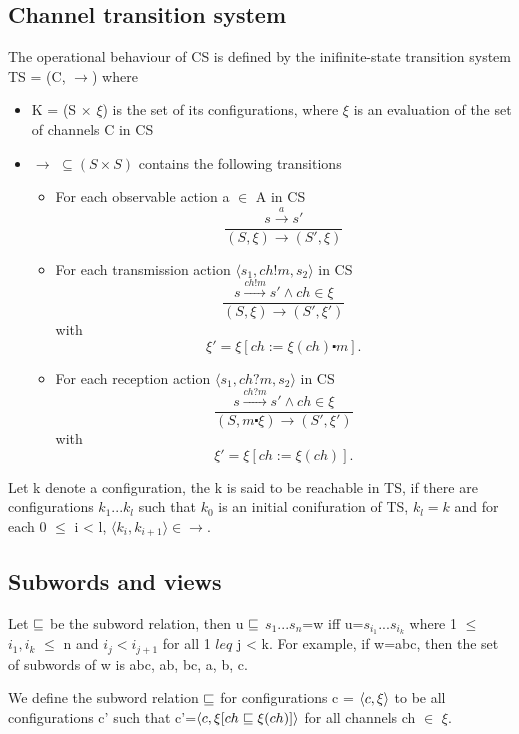 \subsection{Channel transition system}
The operational behaviour of CS is defined by the inifinite-state transition system TS = (C, $\rightarrow$) where
\begin{itemize}
\item[]
   K = (S $\times$ $\xi$) is the set of its configurations, where $\xi$ is an evaluation of the set of channels C in CS
\item[]
  $\rightarrow$ $\subseteq (S \times S)$ contains the following transitions
  \begin{itemize}
    \item
      For each observable action a $\in$ A in CS
      \[
      \dfrac{s \xrightarrow{a} s'}{(S, \xi) \rightarrow (S', \xi)}
      \]
    \item
      For each transmission action $\langle s_1, ch!m, s_2 \rangle$ in CS
      \[
      \dfrac{s \xrightarrow{ch!m} s' \wedge ch \in \xi}{(S, \xi) \rightarrow (S', \xi')} \] with \[ \xi' = \xi[ch := \xi (ch) \centerdot m].
      \]
    \item
      For each reception action $\langle s_1, ch?m, s_2 \rangle$ in CS
      \[
      \dfrac{s \xrightarrow{ch?m} s' \wedge ch \in \xi}{(S, m \centerdot \xi) \rightarrow (S', \xi')} \] with \[ \xi' = \xi[ch:= \xi (ch)].
      \]

  \end{itemize}
\end{itemize}

Let k denote a configuration, the k is said to be reachable in TS, if there are configurations $k_1...k_l$ such that $k_0$ is an initial conifuration of TS, $k_l = k$ and for each 0 $\leq$ i < l, $\langle k_i, k_{i+1} \rangle \in \rightarrow$.

\newpage

\subsection{Subwords and views}

Let $\sqsubseteq$ be the subword relation, then u $\sqsubseteq$ $s_1...s_n$=w iff u=$s_{i_1}...s_{i_k}$ where 1 $\leq$ $i_1,i_k$ $\leq $ n and $i_j < i_{j+1}$ for all 1 $leq$ j < k. For example, if w=abc, then the set of subwords of w is {abc, ab, bc, a, b, c}.

We define the subword relation $\sqsubseteq$ for configurations c = $\langle c,\xi\rangle$ to be all configurations c' such that c'=$\langle c,\xi[ ch \sqsubseteq \xi(ch)]\rangle$ for all channels ch $\in$ $\xi$.

